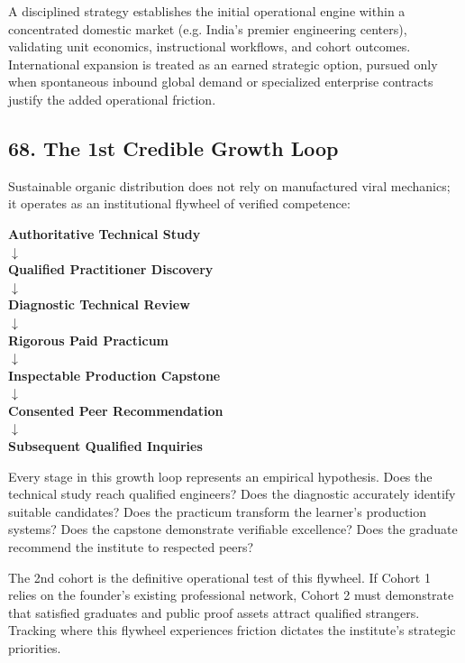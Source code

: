 A disciplined strategy establishes the initial operational engine within a concentrated domestic market (e.g. India's premier engineering centers), validating unit economics, instructional workflows, and cohort outcomes. International expansion is treated as an earned strategic option, pursued only when spontaneous inbound global demand or specialized enterprise contracts justify the added operational friction.

\subsection*{68. The 1st Credible Growth Loop}

Sustainable organic distribution does not rely on manufactured viral mechanics; it operates as an institutional flywheel of verified competence:
\begin{center}
\small
\textbf{Authoritative Technical Study} \\[2pt]
$\downarrow$ \\[2pt]
\textbf{Qualified Practitioner Discovery} \\[2pt]
$\downarrow$ \\[2pt]
\textbf{Diagnostic Technical Review} \\[2pt]
$\downarrow$ \\[2pt]
\textbf{Rigorous Paid Practicum} \\[2pt]
$\downarrow$ \\[2pt]
\textbf{Inspectable Production Capstone} \\[2pt]
$\downarrow$ \\[2pt]
\textbf{Consented Peer Recommendation} \\[2pt]
$\downarrow$ \\[2pt]
\textbf{Subsequent Qualified Inquiries}
\end{center}

Every stage in this growth loop represents an empirical hypothesis. Does the technical study reach qualified engineers? Does the diagnostic accurately identify suitable candidates? Does the practicum transform the learner's production systems? Does the capstone demonstrate verifiable excellence? Does the graduate recommend the institute to respected peers?

The 2nd cohort is the definitive operational test of this flywheel. If Cohort 1 relies on the founder's existing professional network, Cohort 2 must demonstrate that satisfied graduates and public proof assets attract qualified strangers. Tracking where this flywheel experiences friction dictates the institute's strategic priorities.
